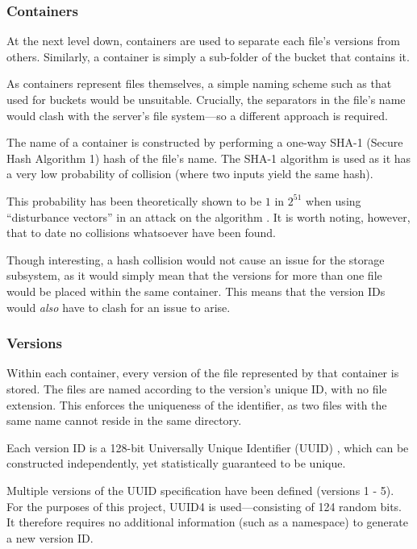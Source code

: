 \subsubsection{Containers}
\label{sec:implementation-server-storage-containers}

At the next level down, containers are used to separate each file's versions
from others. Similarly, a container is simply a sub-folder of the bucket that
contains it.

As containers represent files themselves, a simple naming scheme such as that
used for buckets would be unsuitable. Crucially, the separators in the file's
name would clash with the server's file system---so a different approach is
required.

The name of a container is constructed by performing a one-way SHA-1 (Secure
Hash Algorithm 1) \cite{rfc3174} hash of the file's name. The SHA-1 algorithm
is used as it has a very low probability of collision (where two inputs yield
the same hash).

This probability has been theoretically shown to be $1$ in $2^{51}$ when using
``disturbance vectors'' in an attack on the algorithm \cite{manuelSHA}. It is
worth noting, however, that to date no collisions whatsoever have been found.

Though interesting, a hash collision would not cause an issue for the storage
subsystem, as it would simply mean that the versions for more than one file
would be placed within the same container. This means that the version IDs
would \emph{also} have to clash for an issue to arise.

\subsubsection{Versions}
\label{sec:implementation-server-storage-versions}

Within each container, every version of the file represented by that container
is stored. The files are named according to the version's unique ID, with no
file extension. This enforces the uniqueness of the identifier, as two files
with the same name cannot reside in the same directory.

Each version ID is a 128-bit Universally Unique Identifier (UUID)
\cite{rfc4122}, which can be constructed independently, yet statistically
guaranteed to be unique.

Multiple versions of the UUID specification have been defined (versions 1 - 5).
For the purposes of this project, UUID4 is used---consisting of 124 random
bits. It therefore requires no additional information (such as a namespace) to
generate a new version ID.

